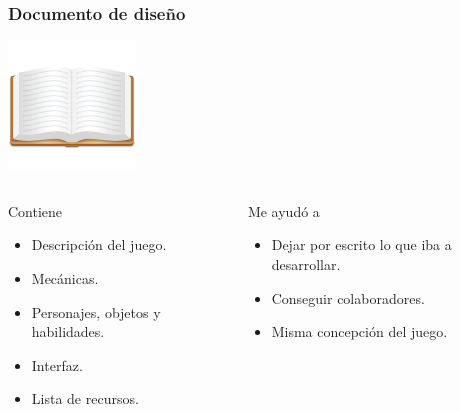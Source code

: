 \documentclass[green]{beamer}
\begin{document}
\begin{frame}
\transdissolve
    \frametitle{Documento de diseño}
    
    \begin{center}
	\includegraphics[scale=0.4]{img/libro.png}
    \end{center}
    
    \scriptsize{
    \begin{columns}[t]
    \column{150pt}
        
	\begin{block}{Contiene}
            \begin{itemize}
                \item Descripción del juego.
		\item Mecánicas.
		\item Personajes, objetos y habilidades.
		\item Interfaz.
		\item Lista de recursos.
            \end{itemize}            
        \end{block}

    \column{150pt}
        
	\begin{block}{Me ayudó a}
            \begin{itemize}
                \item Dejar por escrito lo que iba a desarrollar.
		\item Conseguir colaboradores.
		\item Misma concepción del juego.
            \end{itemize}            
        \end{block}
    \end{columns} 
    }
\end{frame}
\end{document}
